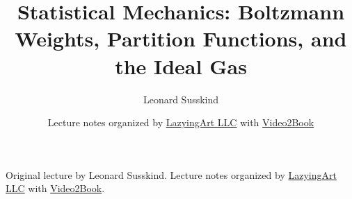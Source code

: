 \documentclass[11pt,oneside]{book}
\begin{document}
\frontmatter
\hypersetup{pageanchor=false}
\title{Statistical Mechanics: Boltzmann Weights, Partition Functions, and the Ideal Gas}
\author{Leonard Susskind}
\date{Lecture notes organized by \href{https://lazying.art}{LazyingArt LLC} with \href{https://github.com/lachlanchen/Video2Book}{Video2Book}}
\maketitle
\begin{center}
\small Original lecture by Leonard Susskind. Lecture notes organized by \href{https://lazying.art}{LazyingArt LLC} with \href{https://github.com/lachlanchen/Video2Book}{Video2Book}.
\end{center}
\clearpage
\hypersetup{pageanchor=true}
\mainmatter

\end{document}
